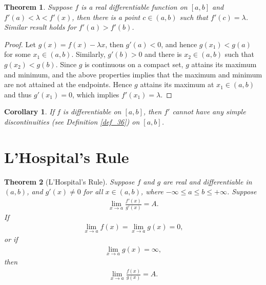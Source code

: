 \documentclass[10pt]{book}
\newtheorem{theorem}{Theorem}[chapter]
\newtheorem{corollary}{Corollary}[theorem]
\theoremstyle{definition}
\numberwithin{equation}{chapter}
\begin{document}
\medskip

\begin{theorem}
Suppose $f$ is a real differentiable function on $[a,b]$ and $f'(a) < \lambda < f'(x)$, then there is a point $c \in (a,b)$ such that $f'(c) = \lambda$. Similar result holds for $f'(a) > f'(b)$.
\end{theorem}
\begin{proof}
Let $g(x) = f(x) - \lambda x$, then $g'(a) < 0$, and hence $g(x_1) < g(a)$ for some $x_1 \in (a,b)$. Similarly, $g'(b) > 0$ and there is $x_2 \in (a,b)$ such that $g(x_2) < g(b)$. Since $g$ is continuous on a compact set, $g$ attains its maximum and minimum, and the above properties implies that the maximum and minimum are not attained at the endpoints. Hence $g$ attains its maximum at $x_1 \in (a,b)$ and thus $g'(x_1) = 0$, which implies $f'(x_1) = \lambda$.
\end{proof}

\medskip

\begin{corollary}
If $f$ is differentiable on $[a,b]$, then $f'$ cannot have any simple discontinuities (see Definition \ref{def_36}) on $[a,b]$.
\end{corollary}

\medskip







\section{L'Hospital's Rule}

\begin{theorem}[L'Hospital's Rule]\label{th_412}
Suppose $f$ and $g$ are real and differentiable in $(a,b)$, and $g'(x) \neq 0$ for all $x \in (a,b)$, where $-\infty \leq a \leq b \leq + \infty$. Suppose
\begin{align}\label{th_412_equ1}
    \lim_{x\to a} \frac{f'(x)}{g'(x)} = A.
\end{align}
If
\begin{align}\label{th_412_equ2}
    \lim_{x\to a} f(x) = \lim_{x\to a} g(x) = 0,
\end{align}
or if
\begin{align}\label{th_412_equ3}
    \lim_{x\to a} g(x) = \infty,
\end{align}
then
\begin{align}\label{th_412_equ4}
    \lim_{x\to a} \frac{f(x)}{g(x)} = A.
\end{align}
\end{theorem}
\end{document}
